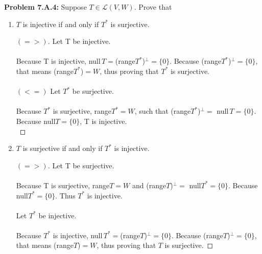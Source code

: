 \documentclass[12pt]{article}
\begin{document}
\noindent \textbf{Problem 7.A.4: }Suppose $T \in \mathcal{L}(V,W)$. Prove that 
	\begin{enumerate}[label = (\alph*)]
		\item $T$ is injective if and only if $T^*$ is surjective.
			\begin{proof}[$(=>)$]
				Let T be injective.
				\\ \\
				Because T is injective, null$\,T = $(range$T^*$)$^\perp = \{0\}$. Because (range$T^*$)$^\perp = \{0\}$, that means (range$T^*$)$ = W$, thus proving that $T^*$ is surjective.
				\\ \\
				$(<=)$ Let $T^*$ be surjective.
				\\ \\
				Because $T^*$ is surjective, range$T^* = W$, such that (range$T^*$)$^\perp =$ null$\,T = \{0\}$. Because null$T = \{ 0 \}$, T is injective. 
				\\
			\end{proof}
		\item $T$ is surjective if and only if $T^*$ is injective.
			\begin{proof}[$(=>)$]
				Let T be surjective.
				\\ \\
				Because T is surjective, range$T = W$ and (range$T$)$^\perp =$ null$T^* = \{0\}$. Because null$T^* = \{0\}$. Thus $T^*$ is injective.  
				\\ \\
				Let $T^*$ be injective.
				\\ \\
				Because $T^*$ is injective, null$\,T^* = $(range$T$)$^\perp = \{0\}$. Because (range$T$)$^\perp = \{0\}$, that means (range$T$)$ = W$, thus proving that $T$ is surjective.
			\end{proof}
	\end{enumerate}

\newpage 
\end{document}
